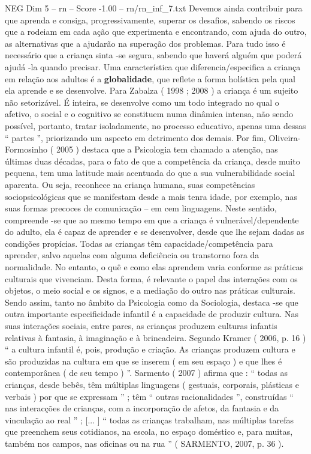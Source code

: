 \begin{textsample}{NEG Dim 5 – rn – Score -1.00 – rn/rn\_inf\_7.txt}
Devemos ainda contribuir para que aprenda e consiga, progressivamente, superar os desafios, sabendo os riscos que a rodeiam em cada ação que experimenta e encontrando, com ajuda do outro, as alternativas que a ajudarão na superação dos problemas.
Para tudo isso é necessário que a criança sinta -se segura, sabendo que haverá alguém que poderá ajudá -la quando precisar.
Uma característica que diferencia/especifica a criança em relação aos adultos é a \textbf{globalidade}, que reflete a forma holística pela qual ela aprende e se desenvolve.
Para Zabalza ( 1998 ; 2008 ) a criança é um sujeito não setorizável.
É inteira, se desenvolve como um todo integrado no qual o afetivo, o social e o cognitivo se constituem numa dinâmica intensa, não sendo possível, portanto, tratar isoladamente, no processo educativo, apenas uma dessas “ partes ”, priorizando um aspecto em detrimento dos demais.
Por fim, Oliveira-Formosinho ( 2005 ) destaca que a Psicologia tem chamado a atenção, nas últimas duas décadas, para o fato de que a competência da criança, desde muito pequena, tem uma latitude mais acentuada do que a sua vulnerabilidade social aparenta.
Ou seja, reconhece na criança humana, suas competências sociopsicológicas que se manifestam desde a mais tenra idade, por exemplo, nas suas formas precoces de comunicação – em cem linguagens.
Neste sentido, compreende -se que ao mesmo tempo em que a criança é vulnerável/dependente do adulto, ela é capaz de aprender e se desenvolver, desde que lhe sejam dadas as condições propícias.
Todas as crianças têm capacidade/competência para aprender, salvo aquelas com alguma deficiência ou transtorno fora da normalidade.
No entanto, o quê e como elas aprendem varia conforme as práticas culturais que vivenciam.
Desta forma, é relevante o papel das interações com os objetos, o meio social e os signos, e a mediação do outro nas práticas culturais.
Sendo assim, tanto no âmbito da Psicologia como da Sociologia, destaca -se que outra importante especificidade infantil é a capacidade de produzir cultura.
Nas suas interações sociais, entre pares, as crianças produzem culturas infantis relativas à fantasia, à imaginação e à brincadeira.
Segundo Kramer ( 2006, p. 16 ) “ a cultura infantil é, pois, produção e criação.
As crianças produzem cultura e são produzidas na cultura em que se inserem ( em seu espaço ) e que lhes é contemporânea ( de seu tempo ) ”.
Sarmento ( 2007 ) afirma que : “ todas as crianças, desde bebês, têm múltiplas linguagens ( gestuais, corporais, plásticas e verbais ) por que se expressam ” ; têm “ outras racionalidades ”, construídas “ nas interacções de crianças, com a incorporação de afetos, da fantasia e da vinculação ao real ” ; [... ] “ todas as crianças trabalham, nas múltiplas tarefas que preenchem seus cotidianos, na escola, no espaço doméstico e, para muitas, também nos campos, nas oficinas ou na rua ” ( SARMENTO, 2007, p. 36 ).

\end{textsample}
